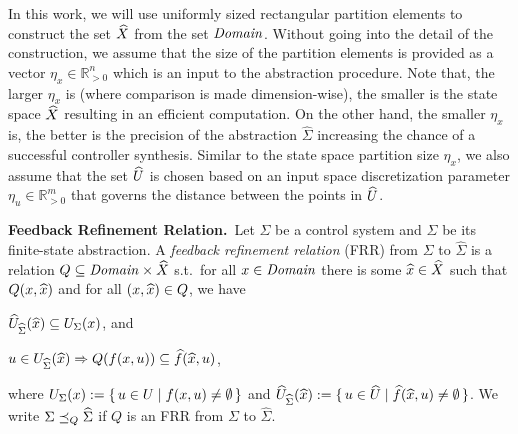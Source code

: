 In this work, we will use uniformly sized rectangular partition elements to construct the set $\widehat{X}$ from the set $\mathit{Domain}$.
Without going into the detail of the construction, we assume that the size of the partition elements is provided as a vector $\eta_x\in \mathbb{R}^n_{>0}$ which is an input to the abstraction procedure.
Note that, the larger $\eta_x$ is (where comparison is made dimension-wise), the smaller is the state space $\widehat{X}$ resulting in an efficient computation.
On the other hand, the smaller $\eta_x$ is, the better is the precision of the abstraction $\widehat{\Sigma}$ increasing the chance of a successful controller synthesis. Similar to the state space partition size $\eta_x$, we also assume that the set $\widehat{U}$ is chosen based on an input space discretization parameter $\eta_u\in \mathbb{R}^m_{>0}$ that governs the distance between the points in $\widehat{U}$.

%

\smallskip
\noindent\textbf{Feedback Refinement Relation.}\
Let $\Sigma$ be a control system and $\widehat{\Sigma}$ be its finite-state abstraction.
A \emph{feedback refinement relation} (FRR) from $\Sigma$ to $\widehat{\Sigma}$ 
is a relation $Q\subseteq \mathit{Domain}\times \widehat{X}$ s.t.\ 
for all $x\in \mathit{Domain}$ there is some $\widehat{x}\in \widehat{X}$ such that $Q(x,\widehat{x})$ and
for all $(x,\widehat{x})\in Q$, we have
\begin{inparaenum}[(i)]
	\item $\widehat{U}_{\widehat{\Sigma}}(\widehat{x})\subseteq U_{\Sigma}(x)$, and 
	\item $u\in U_{\widehat{\Sigma}}(\widehat{x}) \Rightarrow Q(f(x,u))\subseteq \widehat{f}(\widehat{x},u)$,
\end{inparaenum}
where $U_{\Sigma}(x):=\set{u\in U \mid f(x,u)\neq \emptyset}$ and $\widehat{U}_{\widehat{\Sigma}}(\widehat{x}):=\set{u\in \widehat{U}\mid \widehat{f}(\widehat{x},u)\neq \emptyset}$.
We write $\Sigma \preceq_{Q} \widehat{\Sigma}$ if $Q$ is an FRR from $\Sigma$ to $\widehat{\Sigma}$.

